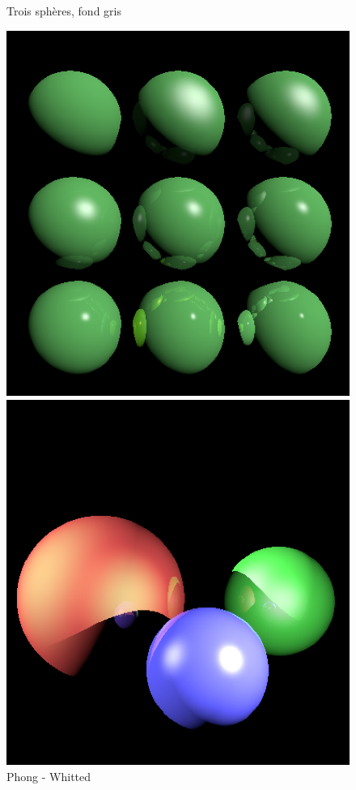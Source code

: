 \documentclass{article}
\begin{document}
\begin{figure}[htb!]
\begin{minipage}{.45\textwidth}
  \caption{Trois sphères, fond gris}
  \label{fig:phdirect}
\end{minipage}
\end{figure}

\begin{figure}[htb!]
\centering
\begin{minipage}{.45\textwidth}
  \centering
  \includegraphics[width=\linewidth]{results/phong_whitted.png}
  \caption{Phong - Whitted}
  \label{fig:tsnormal}
\end{minipage}\hfill
\begin{minipage}{.45\textwidth}
  \centering
  \includegraphics[width=\linewidth]{results/troisSpheres_whitted_NoBG.png}

\end{minipage}
\end{figure}
\end{document}
